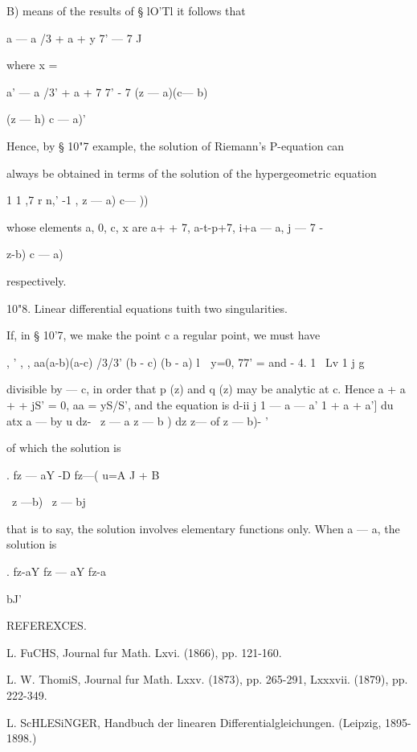 B)  means of the results of § lO'Tl it follows that 

 a — a /3 + a + y 7' — 7 J 




where x = 



a' — a /3' + a + 7 7' - 7 
(z — a)(c— b) 



(z — h) c — a)' 

Hence, by § 10"7 example, the solution of Riemann's P-equation can 

always be obtained in terms of the solution of the hypergeometric equation 

1 1 ,7 r  n,' -1 ,  z — a) c— )) 

whose elements a, 0, c, x are a+  + 7, a-t-p+7, i+a — a, j — 7 - 

 z-b) c — a) 

respectively. 

10"8. Linear differential equations tuith two singularities. 

If, in § 10'7, we make the point c a regular point, we must have 

, ' ,   , aa(a-b)(a-c) /3/3' (b - c) (b - a) 
l\  \ y=0, 77' = and   -  4.   1  \  Lv 1 j   g 

divisible by   — c, in order that p (z) and q (z) may be analytic at c. 
Hence a + a +   + jS' = 0, aa = yS/S', and the equation is 
d-ii j 1 — a — a' 1 + a + a'] du atx  a — by u 
dz- \ z — a z — b ) dz  z— of  z — b)- ' 

of which the solution is 

. fz — aY -D fz—(  
u=A  J + B 



\ z —b) \ z — bj 

that is to say, the solution involves elementary functions only. 
When a — a, the solution is 

. fz-aY   fz — aY   fz-a 



bJ' 



REFEREXCES. 



L. FuCHS, Journal fur Math. Lxvi. (1866), pp. 121-160. 

L. W. ThomiS, Journal fur Math. Lxxv. (1873), pp. 265-291, Lxxxvii. (1879), pp. 222-349. 

L. ScHLESiNGER, Handbuch der linearen Differentialgleichungen. (Leipzig, 1895-1898.) 

